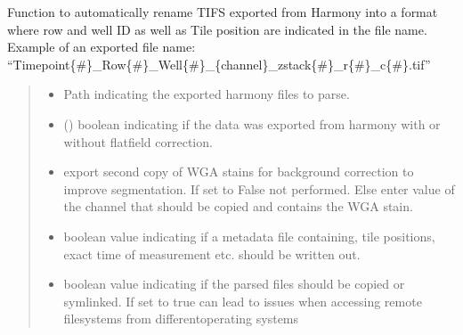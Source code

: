 \documentclass[a4paper,10pt,english,openany,oneside]{sphinxmanual}
\begin{document}
\begin{fulllineitems}
\label{\detokenize{pages/modules:sparcstools.parse.parse_phenix}}
\pysigstartsignatures
{}
\pysigstopsignatures
\sphinxAtStartPar
Function to automatically rename TIFS exported from Harmony into a format where row and well ID as well as Tile position are indicated in the file name.
Example of an exported file name: “Timepoint\{\#\}\_Row\{\#\}\_Well\{\#\}\_\{channel\}\_zstack\{\#\}\_r\{\#\}\_c\{\#\}.tif”
\begin{quote}\begin{description}
\begin{itemize}
\item {} 
\sphinxAtStartPar
{} \textendash{} Path indicating the exported harmony files to parse.

\item {} 
\sphinxAtStartPar
{} () \textendash{} boolean indicating if the data was exported from harmony with or without flatfield correction.

\item {} 
\sphinxAtStartPar
{} \textendash{} export second copy of WGA stains for background correction to improve segmentation. If set to False not performed. Else enter value of the channel
that should be copied and contains the WGA stain.

\item {} 
\sphinxAtStartPar
{} \textendash{} boolean value indicating if a metadata file containing, tile positions, exact time of measurement etc. should be written out.

\item {} 
\sphinxAtStartPar
{} \textendash{} boolean value indicating if the parsed files should be copied or symlinked. If set to true can lead to issues when accessing remote filesystems
from differentoperating systems

\end{itemize}

\end{description}\end{quote}

\end{fulllineitems}
\end{document}
